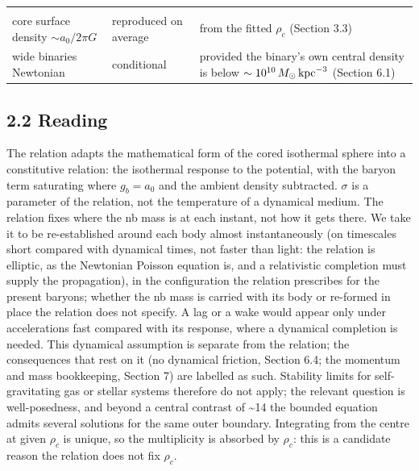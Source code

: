 \documentclass[
  10pt,
]{article}
\begin{document}
\begin{longtable}[]{@{}lll@{}}
\begin{minipage}[t]{0.50\columnwidth}
\end{minipage}\tabularnewline
\begin{minipage}[t]{0.24\columnwidth}\raggedright
core surface density $\sim a_0/2\pi G$\strut
\end{minipage} & \begin{minipage}[t]{0.20\columnwidth}\raggedright
reproduced on average\strut
\end{minipage} & \begin{minipage}[t]{0.50\columnwidth}\raggedright
from the fitted $\rho_c$ (Section 3.3)\strut
\end{minipage}\tabularnewline
\begin{minipage}[t]{0.24\columnwidth}\raggedright
wide binaries Newtonian\strut
\end{minipage} & \begin{minipage}[t]{0.20\columnwidth}\raggedright
conditional\strut
\end{minipage} & \begin{minipage}[t]{0.50\columnwidth}\raggedright
provided the binary's own central density is below $\sim10^{10}\,M_\odot\,{\rm kpc}^{-3}$ (Section 6.1)\strut
\end{minipage}\tabularnewline
\bottomrule
\end{longtable}

\subsection{2.2 Reading}\label{reading}

The relation adapts the mathematical form of the cored isothermal sphere into a constitutive relation: the isothermal response to the potential, with the baryon term saturating where $g_b=a_0$ and the ambient density subtracted. $\sigma$ is a parameter of the relation, not the temperature of a dynamical medium. The relation fixes where the nb mass is at each instant, not how it gets there. We take it to be re-established around each body almost instantaneously (on timescales short compared with dynamical times, not faster than light: the relation is elliptic, as the Newtonian Poisson equation is, and a relativistic completion must supply the propagation), in the configuration the relation prescribes for the present baryons; whether the nb mass is carried with its body or re-formed in place the relation does not specify. A lag or a wake would appear only under accelerations fast compared with its response, where a dynamical completion is needed. This dynamical assumption is separate from the relation; the consequences that rest on it (no dynamical friction, Section 6.4; the momentum and mass bookkeeping, Section 7) are labelled as such. Stability limits for self-gravitating gas or stellar systems therefore do not apply; the relevant question is well-posedness, and beyond a central contrast of \textasciitilde{}14 the bounded equation admits several solutions for the same outer boundary. Integrating from the centre at given $\rho_c$ is unique, so the multiplicity is absorbed by $\rho_c$: this is a candidate reason the relation does not fix $\rho_c$.
\end{document}
